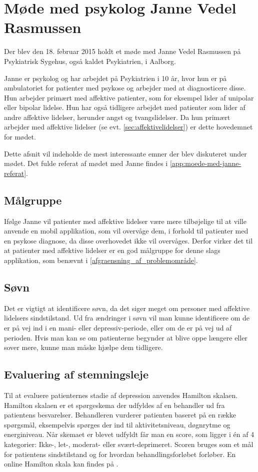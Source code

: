 \section{Møde med psykolog Janne Vedel Rasmussen}\label{sec:moede-med-psykolog}
Der blev den 18. februar 2015 holdt et møde med Janne Vedel Rasmussen på Psykiatrisk Sygehus, også kaldet Psykiatrien, i Aalborg.

Janne er psykolog og har arbejdet på Psykiatrien i 10 år, hvor hun er på ambulatoriet for patienter med psykose og arbejder med at diagnosticere disse. 
Hun arbejder primært med affektive patienter, som for eksempel lider af unipolar eller bipolar lidelse.
Hun har også tidligere arbejdet med patienter som lider af andre affektive lidelser, herunder angst og tvangslidelser.
Da hun primært arbejder med affektive lidelser (se evt. \cref{sec:affektivelidelser}) er dette hovedemnet for mødet.

Dette afsnit vil indeholde de mest interessante emner der blev diskuteret under mødet.
Det fulde referat af mødet med Janne findes i \cref{app:moede-med-janne-referat}.

\subsection{Målgruppe}
Ifølge Janne vil patienter med affektive lidelser være mere tilbøjelige til at ville anvende en mobil applikation, som vil overvåge dem, i forhold til patienter med en psykose diagnose, da disse overhovedet ikke vil overvåges.
Derfor virker det til at patienter med affektive lidelser er en god målgruppe for denne slags applikation, som benævnt i \cref{afgraensning_af_problemområde}.

\subsection{Søvn}
Det er vigtigt at identificere søvn, da det siger meget om personer med affektive lidelsers sindstilstand.
Ud fra ændringer i søvn vil man kunne identificere om de er på vej ind i en mani- eller depressiv-periode, eller om de er på vej ud af perioden. 
Hvis man kan se om patienterne begynder at blive oppe længere eller sover mere, kunne man måske hjælpe dem tidligere.

\subsection{Evaluering af stemningsleje}
Til at evaluere patienternes stadie af depression anvendes Hamilton skalaen.
Hamilton skalaen er et spørgeskema der udfyldes af en behandler ud fra patientens besvarelser. 
Behandleren vurderer patienten baseret på en række spørgsmål, eksempelvis spørges der ind til aktivitetsniveau, døgnrytme og energiniveau.
Når skemaet er blevet udfyldt får man en score, som ligger i én af 4 kategorier: Ikke-, let-, moderat- eller svært-deprimeret. 
Scoren bruges som et mål for patientens sindstilstand og for hvordan behandlingsforløbet forløber.
En online Hamilton skala kan findes på \citet{hamilton}.

